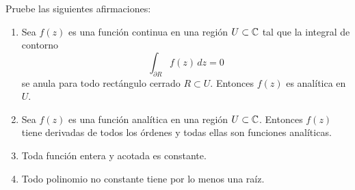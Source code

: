 \begin{exercise}
Pruebe las siguientes afirmaciones:
\begin{enumerate}[label=(\alph*)]
    \item Sea $f(z)$ es una función continua en una región $U \subset \mathbb C$ tal que la integral de contorno
    $$\int_{\partial R} f(z) \, dz = 0$$
    se anula para todo rectángulo cerrado $R \subset U$. Entonces $f(z)$ es analítica en $U$.
    
    \item Sea $f(z)$ es una función analítica en una región $U \subset \mathbb C$. Entonces $f(z)$ tiene derivadas de todos los órdenes y todas ellas son funciones analíticas.
    
    \item Toda función entera y acotada es constante.
    
    \item Todo polinomio no constante tiene por lo menos una raíz.
\end{enumerate}
\end{exercise}

